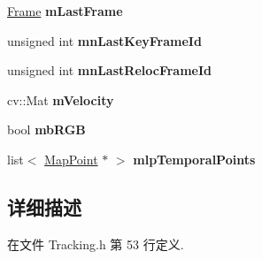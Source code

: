\begin{DoxyCompactItemize}
\item 
\hypertarget{classORB__SLAM2_1_1Tracking_a4f0a80cfb3ddadcb43d7745d15ac9f35}{\hyperlink{classORB__SLAM2_1_1Frame}{Frame} {\bfseries m\-Last\-Frame}}\label{classORB__SLAM2_1_1Tracking_a4f0a80cfb3ddadcb43d7745d15ac9f35}

\item 
\hypertarget{classORB__SLAM2_1_1Tracking_abe5270bc94032722923f43efe7a7bac6}{unsigned int {\bfseries mn\-Last\-Key\-Frame\-Id}}\label{classORB__SLAM2_1_1Tracking_abe5270bc94032722923f43efe7a7bac6}

\item 
\hypertarget{classORB__SLAM2_1_1Tracking_af95975f569dcc3e378c556b8199604b2}{unsigned int {\bfseries mn\-Last\-Reloc\-Frame\-Id}}\label{classORB__SLAM2_1_1Tracking_af95975f569dcc3e378c556b8199604b2}

\item 
\hypertarget{classORB__SLAM2_1_1Tracking_ac2283c13ccf08207c90a6a163d8dbe3c}{cv\-::\-Mat {\bfseries m\-Velocity}}\label{classORB__SLAM2_1_1Tracking_ac2283c13ccf08207c90a6a163d8dbe3c}

\item 
\hypertarget{classORB__SLAM2_1_1Tracking_a01522faf940cc80402f0750b0d90ecf2}{bool {\bfseries mb\-R\-G\-B}}\label{classORB__SLAM2_1_1Tracking_a01522faf940cc80402f0750b0d90ecf2}

\item 
\hypertarget{classORB__SLAM2_1_1Tracking_aadc2690944688adbebeef4a60bdf3cad}{list$<$ \hyperlink{classORB__SLAM2_1_1MapPoint}{Map\-Point} $\ast$ $>$ {\bfseries mlp\-Temporal\-Points}}\label{classORB__SLAM2_1_1Tracking_aadc2690944688adbebeef4a60bdf3cad}

\end{DoxyCompactItemize}


\subsection{详细描述}


在文件 Tracking.\-h 第 53 行定义.



